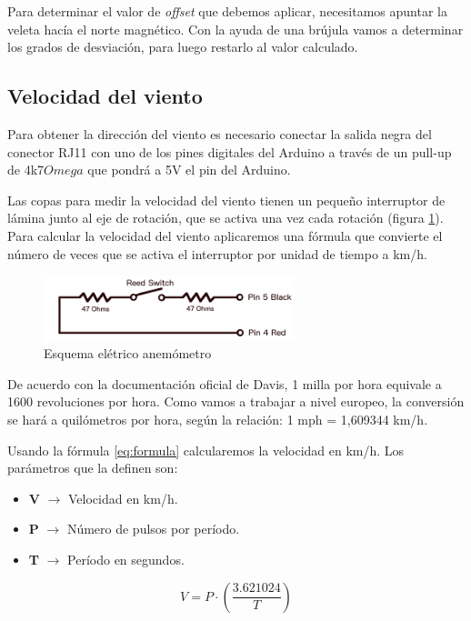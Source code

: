 \documentclass[a4paper, 11pt]{article}
\begin{document}
Para determinar el valor de \textit{offset} que debemos aplicar, necesitamos apuntar la veleta hacía el norte magnético. Con la ayuda de una brújula vamos a determinar los grados de desviación, para luego restarlo al valor calculado.

\subsection{Velocidad del viento}
Para obtener la dirección del viento es necesario conectar la salida negra del conector RJ11 con uno de los pines digitales del Arduino a través de un pull-up de 4k7$Omega$ que pondrá a 5V el pin del Arduino. 

Las copas para medir la velocidad del viento tienen un pequeño interruptor de lámina junto al eje de rotación, que se activa una vez cada rotación (figura \ref{fig:schema2}). Para calcular la velocidad del viento aplicaremos una fórmula que convierte el número de veces que se activa el interruptor por unidad de tiempo a km/h.

\begin{figure}[h]
	\center
	\includegraphics[width=0.65\textwidth]{img/schema2.png}
	\caption{Esquema elétrico anemómetro}
	\label{fig:schema2}
\end{figure}

De acuerdo con la documentación oficial de Davis, 1 milla por hora equivale a 1600 revoluciones por hora. Como vamos a trabajar a nivel europeo, la conversión se hará a quilómetros por hora, según la relación: 1 mph = 1,609344 km/h.

Usando la fórmula \ref{eq:formula} calcularemos la velocidad en km/h. Los parámetros que la definen son:

\begin{itemize}
	\item \textbf{V} $\rightarrow$ Velocidad en km/h.
	\item \textbf{P} $\rightarrow$ Número de pulsos por período.
	\item \textbf{T} $\rightarrow$ Período en segundos. 
\end{itemize}

\begin{equation} 
V = P \cdot \left(\frac{3.621024}{T}\right)
\label{eq:formula}
\end{equation}
\end{document}
